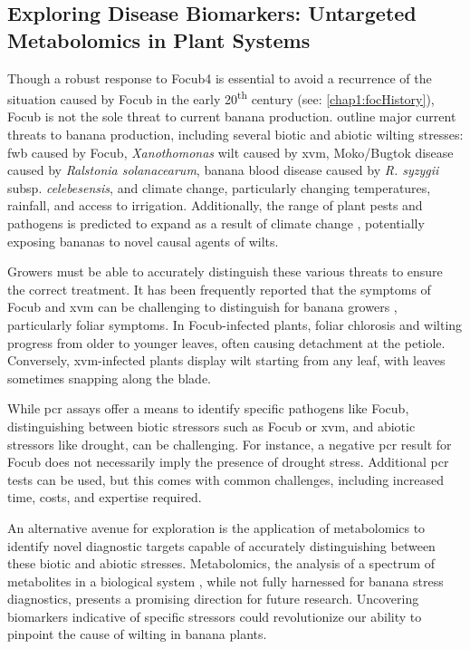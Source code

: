 \subsection{Exploring Disease Biomarkers: Untargeted Metabolomics in Plant Systems}

Though a robust response to \ac{Focub4} is essential to avoid a recurrence of the situation caused by \ac{Focub} in the early 20\textsuperscript{th} century (see: \ref{chap1:focHistory}), \ac{Focub} is not the sole threat to current banana production. \textcite{Ploetz2015c, Bebber2023} outline major current threats to banana production, including several biotic and abiotic wilting stresses: \ac{fwb} caused by \ac{Focub}, \textit{Xanothomonas} wilt caused by \acf{xvm}, Moko/Bugtok disease caused by \textit{Ralstonia solanacearum}, banana blood disease caused by \textit{R. syzygii} subsp. \textit{celebesensis}, and climate change, particularly changing temperatures, rainfall, and access to irrigation. Additionally, the range of plant pests and pathogens is predicted to expand as a result of climate change \parencite{Bebber2015}, potentially exposing bananas to novel causal agents of wilts.

Growers must be able to accurately distinguish these various threats to ensure the correct treatment. It has been frequently reported that the symptoms of \ac{Focub} and \ac{xvm} can be challenging to distinguish for banana growers \parencite{Stellenbosch24, PromusaSymps, Biruma2007}, particularly foliar symptoms. In \ac{Focub}-infected plants, foliar chlorosis and wilting progress from older to younger leaves, often causing detachment at the petiole. Conversely, \ac{xvm}-infected plants display wilt starting from any leaf, with leaves sometimes snapping along the blade. 

While \ac{pcr} assays offer a means to identify specific pathogens like \ac{Focub}, distinguishing between  biotic stressors such as \ac{Focub} or \ac{xvm}, and abiotic stressors like drought, can be challenging. For instance, a negative \ac{pcr} result for \ac{Focub} does not necessarily imply the presence of drought stress. Additional \ac{pcr} tests can be used, but this comes with common challenges, including increased time, costs, and expertise required.

An alternative avenue for exploration is the application of metabolomics to  identify novel diagnostic targets capable of accurately distinguishing between these biotic and abiotic stresses. Metabolomics, the analysis of a spectrum of metabolites in a biological system \parencite{Klassen2017}, while not fully harnessed for banana stress diagnostics, presents a promising direction for future research. Uncovering biomarkers indicative of specific stressors could revolutionize our ability to pinpoint the cause of wilting in banana plants.

